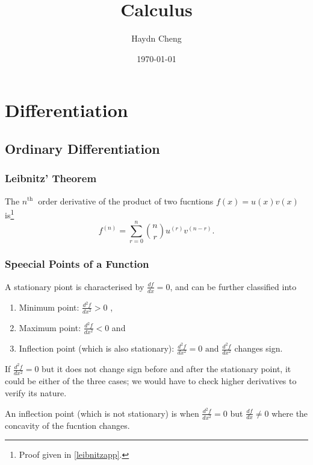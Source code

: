 \documentclass[english,a4paper,12pt]{report}
\title{Calculus}
\author{Haydn Cheng}
\date{\today}
\begin{document}
\maketitle
\tableofcontents

\chapter{Differentiation}

\section{Ordinary Differentiation}

\subsection{Leibnitz' Theorem} \label{leibnitz} 
\begin{theorem}
    The \(n^{\text{th }} \) order derivative of the product of two fucntions \(f(x) = u(x)v(x)\) is\footnote{Proof given in \cref{leibnitzapp}.}  
    \begin{equation}
        f^{(n)} = \sum_{r=0}^{n} \binom{n}{r} u^{(r)} v^{(n-r)}. \label{lei} 
    \end{equation}
\end{theorem}

\subsection{Speecial Points of a Function}

A stationary piont is characterised by \(\frac{df}{dx} = 0\), and can be further classified into 

\begin{enumerate}
    \item Minimum point: \(\frac{d^2f}{dx^2} > 0\) ,
    \item Maximum point: \(\frac{d^2f}{dx^2} < 0\) and
    \item Inflection point (which is also stationary): \(\frac{d^2f}{dx^2} = 0 \text { and }  \frac{d^2f}{dx^2} \)  changes sign.
\end{enumerate}

If \(\frac{d^2f}{dx^2} = 0\) but it does not change sign before and after the stationary point, it could be either of the three cases; we would have to check higher derivatives to verify its nature. 

An inflection point (which is not stationary) is when \(\frac{d^2f}{dx^2} = 0\) but \(\frac{df}{dx} \neq 0\) where the concavity of the fucntion changes.  
\end{document}
